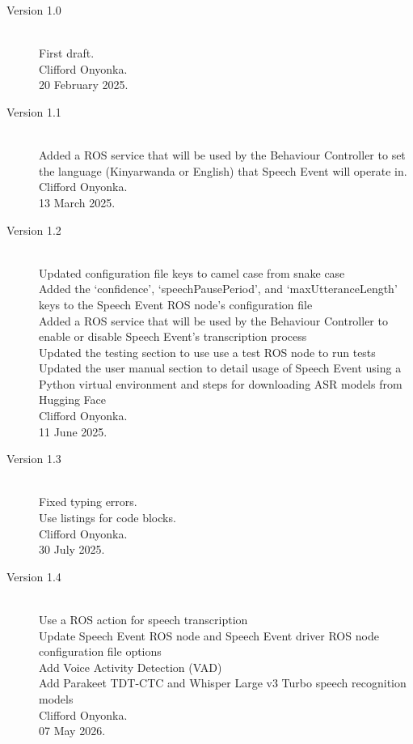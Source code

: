 \documentclass{CSSRforAfrica}
\begin{document}
\begin{description}

\item [Version 1.0]~\\
First draft. \\
Clifford Onyonka. \\                                     %
20 February 2025.                                                        %

\item [Version 1.1]~\\
Added a ROS service that will be used by the Behaviour Controller to set the language (Kinyarwanda or English) that Speech Event will operate in. \\
Clifford Onyonka. \\
13 March 2025.

\item [Version 1.2]~\\
Updated configuration file keys to camel case from snake case \\
Added the `confidence', `speechPausePeriod', and `maxUtteranceLength' keys to the Speech Event ROS node's configuration file \\
Added a ROS service that will be used by the Behaviour Controller to enable or disable Speech Event's transcription process \\
Updated the testing section to use use a test ROS node to run tests \\
Updated the user manual section to detail usage of Speech Event using a Python virtual environment and steps for downloading ASR models from Hugging Face \\
Clifford Onyonka. \\
11 June 2025.

\item [Version 1.3]~\\
Fixed typing errors.\\
Use listings for code blocks.\\
Clifford Onyonka. \\
30 July 2025.

\item [Version 1.4]~\\
Use a ROS action for speech transcription\\
Update Speech Event ROS node and Speech Event driver ROS node configuration file options\\
Add Voice Activity Detection (VAD)\\
Add Parakeet TDT-CTC and Whisper Large v3 Turbo speech recognition models\\
Clifford Onyonka. \\
07 May 2026.



\end{description}
\end{document}
